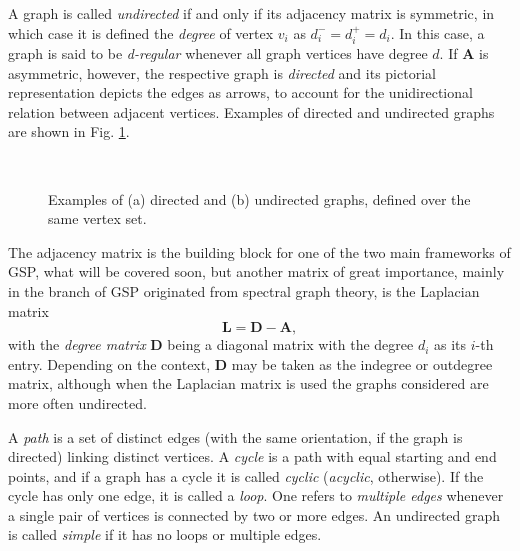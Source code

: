 A graph is called \emph{undirected} if and only if its adjacency matrix is symmetric, in which case it is defined the \emph{degree} of vertex $ v_i $ as $ d_i^- = d_i^+ = d_i $. In this case, a graph is said to be \emph{d-regular} whenever all graph vertices have degree $ d $\label{pag:regular}. If $ \mathbf{A} $ is asymmetric, however, the respective graph is \emph{directed} and its pictorial representation depicts the edges as arrows, to account for the unidirectional relation between adjacent vertices. Examples of directed and undirected graphs are shown in Fig. \ref{fig:example_graphs}.

\begin{figure}
	\centering
	~
	\caption{Examples of (a) directed and (b) undirected graphs, defined over the same vertex set.}
	\label{fig:example_graphs}
\end{figure}

The adjacency matrix is the building block for one of the two main frameworks of GSP, what will be covered soon, but another matrix of great importance, mainly in the branch of GSP originated from spectral graph theory, is the Laplacian matrix
\begin{equation}
\mathbf{L} = \mathbf{D} - \mathbf{A},
\end{equation}
with the \emph{degree matrix} $ \mathbf{D} $ being a diagonal matrix with the degree $ d_i $ as its $ i $-th entry. Depending on the context, $ \mathbf{D} $ may be taken as the indegree or outdegree matrix, although when the Laplacian matrix is used the graphs considered are more often undirected.

A \emph{path} is a set of distinct edges (with the same orientation, if the graph is directed) linking distinct vertices. A \emph{cycle} is a path with equal starting and end points, and if a graph has a cycle it is called \emph{cyclic} (\emph{acyclic}, otherwise). If the cycle has only one edge, it is called a \emph{loop}. One refers to \emph{multiple edges} whenever a single pair of vertices is connected by two or more edges. An undirected graph is called \emph{simple} if it has no loops or multiple edges.

